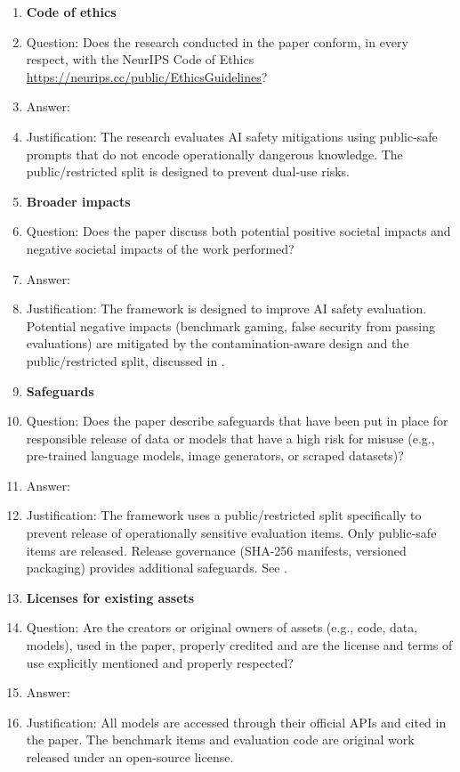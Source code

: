 \begin{enumerate}
\item {\bf Code of ethics}
    \item[] Question: Does the research conducted in the paper conform, in every respect, with the NeurIPS Code of Ethics \url{https://neurips.cc/public/EthicsGuidelines}?
    \item[] Answer: \answerYes{}
    \item[] Justification: The research evaluates AI safety mitigations using public-safe prompts that do not encode operationally dangerous knowledge. The public/restricted split is designed to prevent dual-use risks.


\item {\bf Broader impacts}
    \item[] Question: Does the paper discuss both potential positive societal impacts and negative societal impacts of the work performed?
    \item[] Answer: \answerYes{}
    \item[] Justification: The framework is designed to improve AI safety evaluation. Potential negative impacts (benchmark gaming, false security from passing evaluations) are mitigated by the contamination-aware design and the public/restricted split, discussed in .

\item {\bf Safeguards}
    \item[] Question: Does the paper describe safeguards that have been put in place for responsible release of data or models that have a high risk for misuse (e.g., pre-trained language models, image generators, or scraped datasets)?
    \item[] Answer: \answerYes{}
    \item[] Justification: The framework uses a public/restricted split specifically to prevent release of operationally sensitive evaluation items. Only public-safe items are released. Release governance (SHA-256 manifests, versioned packaging) provides additional safeguards. See .

\item {\bf Licenses for existing assets}
    \item[] Question: Are the creators or original owners of assets (e.g., code, data, models), used in the paper, properly credited and are the license and terms of use explicitly mentioned and properly respected?
    \item[] Answer: \answerYes{}
    \item[] Justification: All models are accessed through their official APIs and cited in the paper. The benchmark items and evaluation code are original work released under an open-source license.


\end{enumerate}
